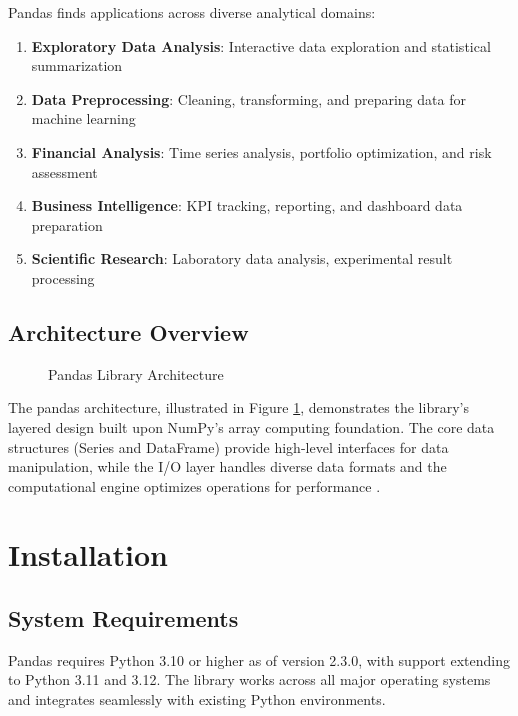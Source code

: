 Pandas finds applications across diverse analytical domains:

\begin{enumerate}
	\item \textbf{Exploratory Data Analysis}: Interactive data exploration and statistical summarization
	\item \textbf{Data Preprocessing}: Cleaning, transforming, and preparing data for machine learning
	\item \textbf{Financial Analysis}: Time series analysis, portfolio optimization, and risk assessment
	\item \textbf{Business Intelligence}: KPI tracking, reporting, and dashboard data preparation
	\item \textbf{Scientific Research}: Laboratory data analysis, experimental result processing
\end{enumerate}

\subsection{Architecture Overview}
\label{subsec:architecture}

\begin{figure}[H]
	\centering
	
	\caption{Pandas Library Architecture \cite{Pandas:2024}}
	\label{fig:pandas_architecture}
\end{figure}

The pandas architecture, illustrated in Figure \ref{fig:pandas_architecture}, demonstrates the library's layered design built upon NumPy's array computing foundation. The core data structures (Series and DataFrame) provide high-level interfaces for data manipulation, while the I/O layer handles diverse data formats and the computational engine optimizes operations for performance \cite{Pandas:2024}.

\clearpage

\section{Installation}
\label{sec:installation}

\subsection{System Requirements}
\label{subsec:system_requirements}

Pandas requires Python 3.10 or higher as of version 2.3.0, with support extending to Python 3.11 and 3.12. The library works across all major operating systems and integrates seamlessly with existing Python environments.

